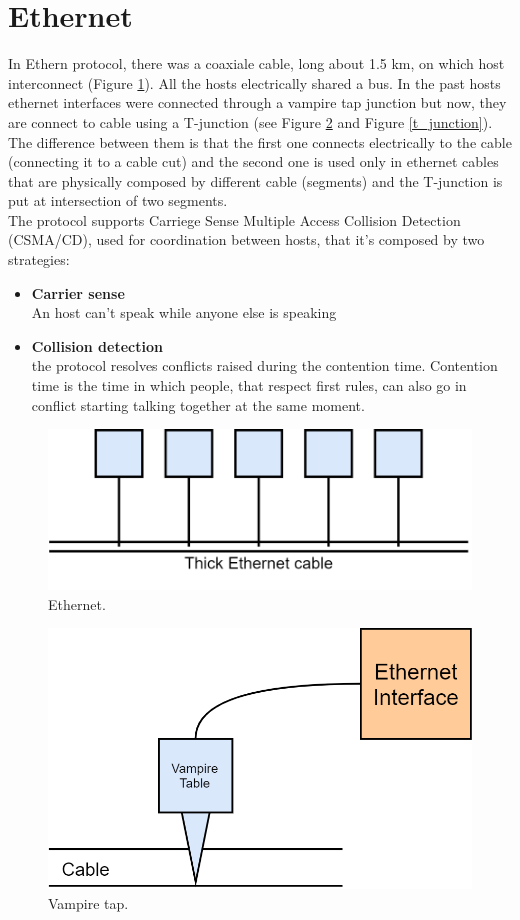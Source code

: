 \section{Ethernet}
In Ethern protocol, there was a coaxiale cable, long about 1.5 km, on which host interconnect (Figure \ref{ethernet}). All the hosts electrically shared a bus. In the past hosts ethernet interfaces were connected through a vampire tap junction but now, they are connect to cable using a T-junction (see Figure \ref{vampire_tap} and Figure \ref{t_junction}). The difference between them is that the first one connects electrically to the cable (connecting it to a cable cut) and the second one is used only in ethernet cables that are physically composed by different cable (segments) and the T-junction is put at intersection of two segments.\\
The protocol supports Carriege Sense Multiple Access Collision Detection (CSMA/CD), used for coordination between hosts, that it's composed by two strategies:
\begin{itemize}
\item{\textbf{Carrier sense}\\
An host can't speak while anyone else is speaking}
\item{\textbf{Collision detection}\\
the protocol resolves conflicts raised during the contention time. Contention time is the time in which people, that respect first rules, can also go in conflict starting talking together at the same moment.}
\end{itemize}
\begin{figure}[h]
\centering
\includegraphics[scale=0.3]{Images/Layer2/ethernet}
\caption{\footnotesize{Ethernet.}}\label{ethernet}
\end{figure}
\begin{figure}[h]
\centering
\includegraphics[scale=0.3]{Images/Layer2/vampire_tap}
\caption{\footnotesize{Vampire tap.}}\label{vampire_tap}
\end{figure}
